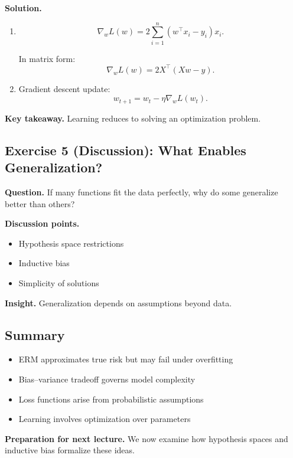 \medskip

\noindent
\textbf{Solution.}

\begin{enumerate}
    \item 
    \[
    \nabla_w L(w) = 2 \sum_{i=1}^n (w^\top x_i - y_i) x_i.
    \]

    In matrix form:
    \[
    \nabla_w L(w) = 2 X^\top (Xw - y).
    \]

    \item Gradient descent update:
    \[
    w_{t+1} = w_t - \eta \nabla_w L(w_t).
    \]
\end{enumerate}

\medskip

\noindent
\textbf{Key takeaway.}  
Learning reduces to solving an optimization problem.

\subsection{Exercise 5 (Discussion): What Enables Generalization?}

\textbf{Question.}  
If many functions fit the data perfectly, why do some generalize better than others?

\medskip

\noindent
\textbf{Discussion points.}
\begin{itemize}
    \item Hypothesis space restrictions
    \item Inductive bias
    \item Simplicity of solutions
\end{itemize}

\medskip

\noindent
\textbf{Insight.}  
Generalization depends on assumptions beyond data.

\subsection{Summary}

\begin{itemize}
    \item ERM approximates true risk but may fail under overfitting
    \item Bias--variance tradeoff governs model complexity
    \item Loss functions arise from probabilistic assumptions
    \item Learning involves optimization over parameters
\end{itemize}

\medskip

\noindent
\textbf{Preparation for next lecture.}  
We now examine how hypothesis spaces and inductive bias formalize these ideas.